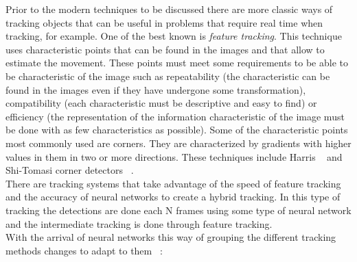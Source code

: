 \documentclass{bmvc2k}
\begin{document}
Prior to the modern techniques to be discussed there are more classic ways of tracking objects that can be useful in problems that require real time when tracking, for example. One of the best known is \textit{feature tracking}. This technique uses characteristic points that can be found in the images and that allow to estimate the movement. These points must meet some requirements to be able to be characteristic of the image such as repeatability (the characteristic can be found in the images even if they have undergone some transformation), compatibility (each characteristic must be descriptive and easy to find) or efficiency (the representation of the information characteristic of the image must be done with as few characteristics as possible). Some of the characteristic points most commonly used are corners. They are characterized by gradients with higher values in them in two or more directions. These techniques include Harris ~\cite{harris1988combined} and Shi-Tomasi corner detectors ~\cite{shi1994good}.\\
There are tracking systems that take advantage of the speed of feature tracking and the accuracy of neural networks to create a hybrid tracking. In this type of tracking the detections are done each N frames using some type of neural network and the intermediate tracking is done through feature tracking.\\
With the arrival of neural networks this way of grouping the different tracking methods changes to adapt to them ~\cite{held2016learning}:
\end{document}
